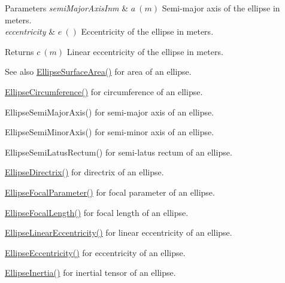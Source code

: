 \begin{DoxyParams}{Parameters}
{\em semi\+Major\+Axis\+Inm} & $ a\ (m)$ Semi-\/major axis of the ellipse in meters. \\
\hline
{\em eccentricity} & $ e\ ()$ Eccentricity of the ellipse in meters. \\
\hline
\end{DoxyParams}
\begin{DoxyReturn}{Returns}
$ c\ (m)$ Linear eccentricity of the ellipse in meters. 
\end{DoxyReturn}
\begin{DoxySeeAlso}{See also}
\mbox{\hyperlink{group___e_g_x_math-_geometry-2_d-_ellipse-_surface_area_ga4ce8c8323e9718ce5458f4ab7f6d823d}{Ellipse\+Surface\+Area()}} for area of an ellipse. 

\mbox{\hyperlink{group___e_g_x_math-_geometry-2_d-_ellipse-_circumference_ga4172802ac674eb53467b44928ac635c7}{Ellipse\+Circumference()}} for circumference of an ellipse. 

Ellipse\+Semi\+Major\+Axis() for semi-\/major axis of an ellipse. 

Ellipse\+Semi\+Minor\+Axis() for semi-\/minor axis of an ellipse. 

Ellipse\+Semi\+Latus\+Rectum() for semi-\/latus rectum of an ellipse. 

\mbox{\hyperlink{group___e_g_x_math-_geometry-2_d-_ellipse-_directrix_gace8f72a8efbc9c18d3eb689151405106}{Ellipse\+Directrix()}} for directrix of an ellipse. 

\mbox{\hyperlink{group___e_g_x_math-_geometry-2_d-_ellipse-_focal_parameter_ga4cd01a38c72c092ef9791351948bf69b}{Ellipse\+Focal\+Parameter()}} for focal parameter of an ellipse. 

\mbox{\hyperlink{group___e_g_x_math-_geometry-2_d-_ellipse-_focal_length_gab8d63de7640c880cfecaeada6f2afdac}{Ellipse\+Focal\+Length()}} for focal length of an ellipse. 

\mbox{\hyperlink{group___e_g_x_math-_geometry-2_d-_ellipse-_linear_eccentricity_gac70b3010e30aa8b73deb50fe2b9b9a91}{Ellipse\+Linear\+Eccentricity()}} for linear eccentricity of an ellipse. 

\mbox{\hyperlink{group___e_g_x_math-_geometry-2_d-_ellipse-_eccentricity_ga6a0a7fba17f782616894cfc447628c33}{Ellipse\+Eccentricity()}} for eccentricity of an ellipse. 

\mbox{\hyperlink{group___e_g_x_math-_geometry-2_d-_ellipse-_inertia_ga10a3049c2f04b50f271fb01dc62e4cf8}{Ellipse\+Inertia()}} for inertial tensor of an ellipse. 
\end{DoxySeeAlso}
\mbox{\label{group___e_g_x_math-_geometry-2_d-_ellipse-_linear_eccentricity_gaa5eb80a161cf3597ea6971f4a1d2f8e8}} 
